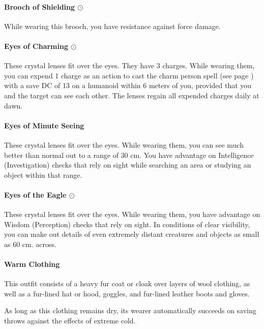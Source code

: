     \paragraph{Brooch of Shielding $\odot$}
        While wearing this brooch, you have resistance against force damage.
    \paragraph{Eyes of Charming $\odot$}
        These crystal lenses fit over the eyes.
        They have 3 charges.
        While wearing them, you can expend 1 charge as an action to cast the charm person spell (see page \pageref{spell::charmperson}) with a save DC of 13 on a humanoid within 6 meters of you, provided that you and the target can see each other.
        The lenses regain all expended charges daily at dawn.
    \paragraph{Eyes of Minute Seeing}
        These crystal lenses fit over the eyes.
        While wearing them, you can see much better than normal out to a range of 30 cm.
        You have advantage on Intelligence (Investigation) checks that rely on sight while searching an area or studying an object within that range.
    \paragraph{Eyes of the Eagle $\odot$}
        These crystal lenses fit over the eyes.
        While wearing them, you have advantage on Wisdom (Perception) checks that rely on sight.
        In conditions of clear visibility, you can make out details of even extremely distant creatures and objects as small as 60 cm. across.
    \paragraph{Warm Clothing}
        This outfit consists of a heavy fur coat or cloak over layers of wool clothing, as well as a fur-lined hat or hood, goggles, and fur-lined leather boots and gloves.

        As long as this clothing remains dry, its wearer automatically succeeds on saving throws against the effects of extreme cold.
\newpage~\newpage
